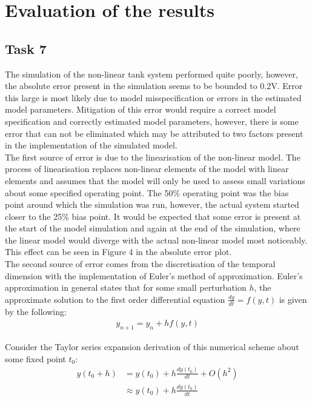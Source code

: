 \documentclass{article}
\begin{document}

\section{Evaluation of the results}

\subsection{Task 7}
The simulation of the non-linear tank system performed quite poorly, however, the absolute error present in the simulation seems to be bounded to 0.2V. Error this large is most likely due to model misspecification or errors in the estimated model parameters. Mitigation of this error would require a correct model specification and correctly estimated model parameters, however, there is some error that can not be eliminated which may be attributed to two factors present in the implementation of the simulated model.\\

The first source of error is due to the linearisation of the non-linear model. The process of linearisation replaces non-linear elements of the model with linear elements and assumes that the model will only be used to assess small variations about some specified operating point. The 50\% operating point was the bias point around which the simulation was run, however, the actual system started closer to the 25\% bias point. It would be expected that some error is present at the start of the model simulation and again at the end of the simulation, where the linear model would diverge with the actual non-linear model most noticeably. This effect can be seen in Figure 4 in the absolute error plot.\\

The second source of error comes from the discretisation of the temporal dimension with the implementation of Euler's method of approximation. Euler's approximation in general states that for some small perturbation $h$, the approximate solution to the first order differential equation $\frac{dy}{dt} = f(y,t)$ is given by the following:
\begin{align}
	y_{n+1} = y_n + hf(y,t) 
\end{align}

Consider the Taylor series expansion derivation of this numerical scheme about some fixed point $t_0$:
\begin{align}
	y(t_0+h) 	&= y(t_0) + h\frac{dy(t_0)}{dt} + O(h^2) \nonumber \\
				&\approx y(t_0) + h\frac{dy(t_0)}{dt} \nonumber
\end{align}
\end{document}
